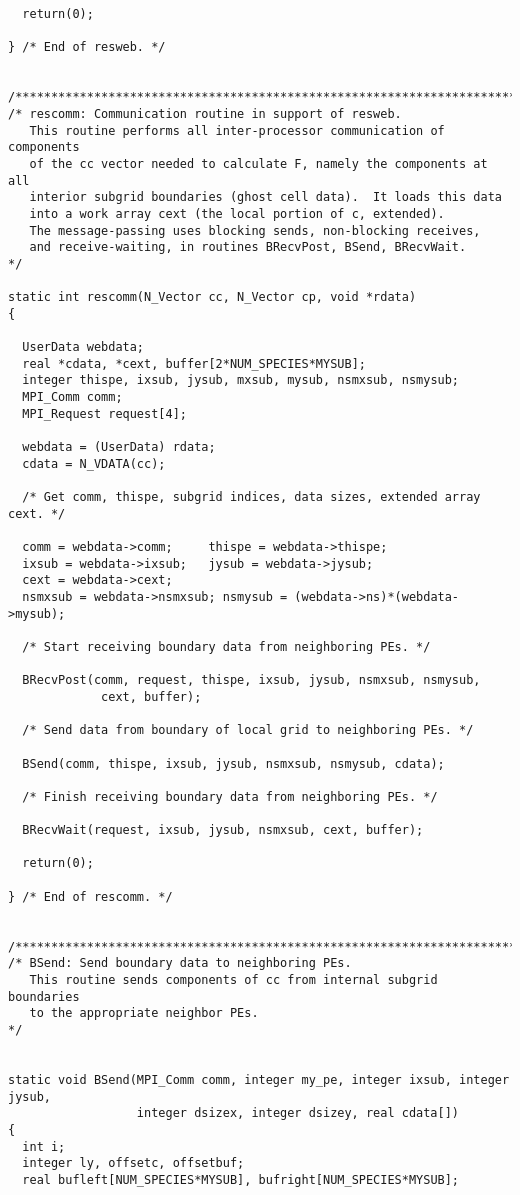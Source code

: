 \begin{verbatim}
  return(0);
 
} /* End of resweb. */


/*************************************************************************/
/* rescomm: Communication routine in support of resweb.
   This routine performs all inter-processor communication of components
   of the cc vector needed to calculate F, namely the components at all
   interior subgrid boundaries (ghost cell data).  It loads this data
   into a work array cext (the local portion of c, extended).
   The message-passing uses blocking sends, non-blocking receives,
   and receive-waiting, in routines BRecvPost, BSend, BRecvWait.         */

static int rescomm(N_Vector cc, N_Vector cp, void *rdata)
{

  UserData webdata;
  real *cdata, *cext, buffer[2*NUM_SPECIES*MYSUB];
  integer thispe, ixsub, jysub, mxsub, mysub, nsmxsub, nsmysub;
  MPI_Comm comm;
  MPI_Request request[4];

  webdata = (UserData) rdata;
  cdata = N_VDATA(cc);

  /* Get comm, thispe, subgrid indices, data sizes, extended array cext. */

  comm = webdata->comm;     thispe = webdata->thispe;
  ixsub = webdata->ixsub;   jysub = webdata->jysub;
  cext = webdata->cext;
  nsmxsub = webdata->nsmxsub; nsmysub = (webdata->ns)*(webdata->mysub);

  /* Start receiving boundary data from neighboring PEs. */

  BRecvPost(comm, request, thispe, ixsub, jysub, nsmxsub, nsmysub, 
             cext, buffer);

  /* Send data from boundary of local grid to neighboring PEs. */

  BSend(comm, thispe, ixsub, jysub, nsmxsub, nsmysub, cdata);

  /* Finish receiving boundary data from neighboring PEs. */

  BRecvWait(request, ixsub, jysub, nsmxsub, cext, buffer);

  return(0);

} /* End of rescomm. */


/*************************************************************************/
/* BSend: Send boundary data to neighboring PEs.
   This routine sends components of cc from internal subgrid boundaries
   to the appropriate neighbor PEs.                                      */
 

static void BSend(MPI_Comm comm, integer my_pe, integer ixsub, integer jysub,
                  integer dsizex, integer dsizey, real cdata[])
{
  int i;
  integer ly, offsetc, offsetbuf;
  real bufleft[NUM_SPECIES*MYSUB], bufright[NUM_SPECIES*MYSUB];


\end{verbatim}
